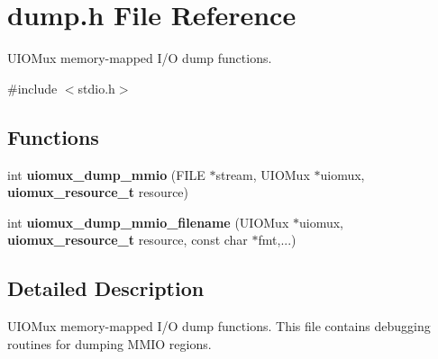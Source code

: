 \section{dump.h File Reference}
\label{dump_8h}


UIOMux memory-\/mapped I/O dump functions.  


{\ttfamily \#include $<$stdio.h$>$}\par
\subsection*{Functions}
\begin{DoxyCompactItemize}
\item 
int {\bfseries uiomux\_\-dump\_\-mmio} (FILE $\ast$stream, UIOMux $\ast$uiomux, {\bf uiomux\_\-resource\_\-t} resource)\label{dump_8h_a8d68690fc2a418cbb6834634aea83876}

\item 
int {\bfseries uiomux\_\-dump\_\-mmio\_\-filename} (UIOMux $\ast$uiomux, {\bf uiomux\_\-resource\_\-t} resource, const char $\ast$fmt,...)\label{dump_8h_a5c2f64f656879160ba6cb8386b5c4f0b}

\end{DoxyCompactItemize}


\subsection{Detailed Description}
UIOMux memory-\/mapped I/O dump functions. This file contains debugging routines for dumping MMIO regions. 